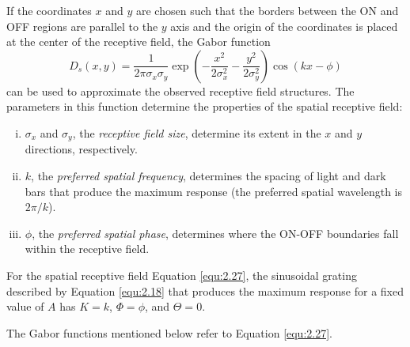 \begin{defn}
  If the coordinates $x$ and $y$ are chosen such that the borders between the ON and OFF regions are parallel to the $y$ axis and the origin of the coordinates is placed at the center of the receptive field, the Gabor function
  \begin{equation}
    \label{equ:2.27}
    D_s(x,y) = \frac{1}{2\pi\sigma_x\sigma_y}\exp\left(-\frac{x^2}{2\sigma_x^2}-\frac{y^2}{2\sigma_y^2}\right)\cos(kx-\phi)
  \end{equation}
  can be used to approximate the observed receptive field structures.
  The parameters in this function determine the properties of the spatial receptive field:
  \begin{enumerate}[(i)]
  \item $\sigma_x$ and $\sigma_y$, the \emph{receptive field size}, determine its extent in the $x$ and $y$ directions, respectively.
  \item $k$, the \emph{preferred spatial frequency}, determines the spacing of light and dark bars that produce the maximum response (the preferred spatial wavelength is $2\pi/k$).
  \item $\phi$, the \emph{preferred spatial phase}, determines where the ON-OFF boundaries fall within the receptive field.
  \end{enumerate}
\end{defn}

\begin{prop}
  For the spatial receptive field Equation \ref{equ:2.27}, the sinusoidal grating described by Equation \ref{equ:2.18} that produces the maximum response for a fixed value of $A$ has $K = k$, $\Phi = \phi$, and $\Theta = 0$.
\end{prop}

\begin{ntn}%
  The Gabor functions mentioned below refer to Equation \ref{equ:2.27}.
\end{ntn}

